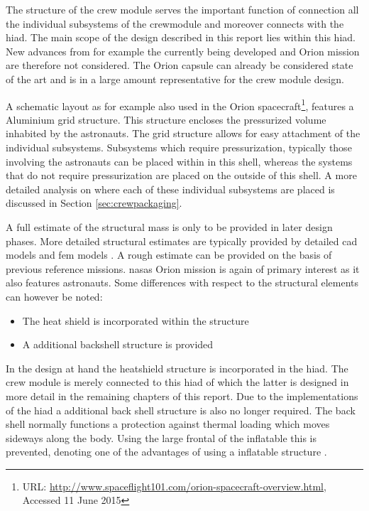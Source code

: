 The structure of the crew module serves the important function of connection all the individual subsystems of the crewmodule and moreover connects with the \gls{hiad}. The main scope of the design described in this report lies within this \gls{hiad}. New advances from for example the currently being developed and Orion mission are therefore not considered. The Orion capsule can already be considered state of the art and is in a large amount representative for the crew module design.

A schematic layout as for example also used in the Orion spacecraft\footnote{URL: \url{http://www.spaceflight101.com/orion-spacecraft-overview.html}, Accessed 11 June 2015 }, features a Aluminium grid structure. This structure encloses the pressurized volume inhabited by the astronauts. The grid structure allows for easy attachment of the individual subsystems. Subsystems which require pressurization, typically those involving the astronauts can be placed within in this shell, whereas the systems that do not require pressurization are placed on the outside of this shell. A more detailed analysis on where each of these individual subsystems are placed is discussed in Section \ref{sec:crewpackaging}.


A full estimate of the structural mass is only to be provided in later design phases. More detailed structural estimates are typically provided by detailed \gls{cad} models and \gls{fem} models \cite{Wertz2011}. A rough estimate can be provided on the basis of previous reference missions. \glspl{nasa} Orion mission is again of primary interest as it also features astronauts. Some differences with respect to the structural elements can however be noted:

\begin{itemize}
\item The heat shield is incorporated within the structure
\item A additional backshell structure is provided
\end{itemize}


In the design at hand the heatshield structure is incorporated in the \gls{hiad}. The crew module is merely connected to this \gls{hiad} of which the latter is designed in more detail in the remaining chapters of this report. Due to the implementations of the \gls{hiad} a additional back shell structure is also no longer required. The back shell normally functions a protection against thermal loading which moves sideways along the body. Using the large frontal of the inflatable this is prevented, denoting one of the advantages of using a inflatable structure \cite{Hughes2005}. 

